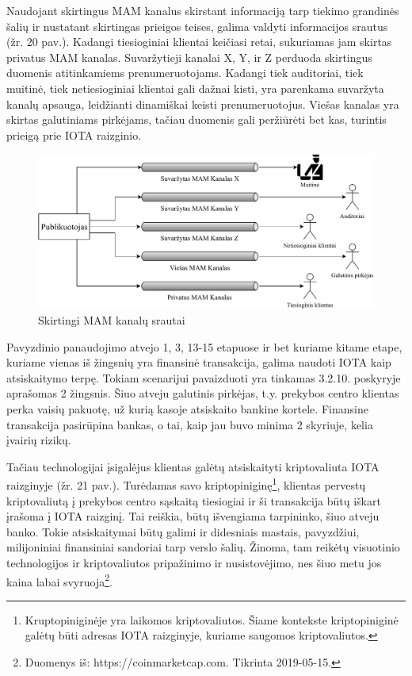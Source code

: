 Naudojant skirtingus MAM kanalus skirstant informaciją tarp tiekimo grandinės šalių ir nustatant skirtingas prieigos teises, galima valdyti informacijos srautus (žr. 20 pav.). Kadangi tiesioginiai klientai keičiasi retai, sukuriamas jam skirtas privatus MAM kanalas. Suvaržytieji kanalai X, Y, ir Z perduoda skirtingus duomenis atitinkamiems prenumeruotojams. Kadangi tiek auditoriai, tiek muitinė, tiek netiesioginiai klientai gali dažnai kisti, yra parenkama suvaržyta kanalų apsauga, leidžianti dinamiškai keisti prenumeruotojus. Viešas kanalas yra skirtas galutiniams pirkėjams, tačiau duomenis gali peržiūrėti bet kas, turintis prieigą prie IOTA raizginio.

\begin{figure}[H]
    \centering
    \includegraphics[scale=0.8]{images/mam-channel-flows}
    \caption{Skirtingi MAM kanalų srautai}
\end{figure}

Pavyzdinio panaudojimo atvejo 1, 3, 13-15 etapuose ir bet kuriame kitame etape, kuriame vienas iš žingsnių yra finansinė transakcija, galima naudoti IOTA kaip atsiskaitymo terpę. Tokiam scenarijui pavaizduoti yra tinkamas 3.2.10. poskyryje aprašomas 2 žingsnis. Šiuo atveju galutinis pirkėjas, t.y. prekybos centro klientas perka vaisių pakuotę, už kurią kasoje atsiskaito bankine kortele. Finansine transakcija pasirūpina bankas, o tai, kaip jau buvo minima 2 skyriuje, kelia įvairių rizikų.

Tačiau technologijai įsigalėjus klientas galėtų atsiskaityti kriptovaliuta IOTA raizginyje (žr. 21 pav.). Turėdamas savo kriptopiniginę\footnote{Kruptopiniginėje yra laikomos kriptovaliutos. Šiame kontekste kriptopiniginė galėtų būti adresas IOTA raizginyje, kuriame saugomos kriptovaliutos.}, klientas pervestų kriptovaliutą į prekybos centro sąskaitą tiesiogiai ir ši transakcija būtų iškart įrašoma į IOTA raizginį. Tai reiškia, būtų išvengiama tarpininko, šiuo atveju banko. Tokie atsiskaitymai būtų galimi ir didesniais mastais, pavyzdžiui, milijoniniai finansiniai sandoriai tarp verslo šalių. Žinoma, tam reikėtų visuotinio technologijos ir kriptovaliutos pripažinimo ir nusistovėjimo, nes šiuo metu jos kaina labai svyruoja\footnote{Duomenys iš: https://coinmarketcap.com. Tikrinta 2019-05-15.}.

